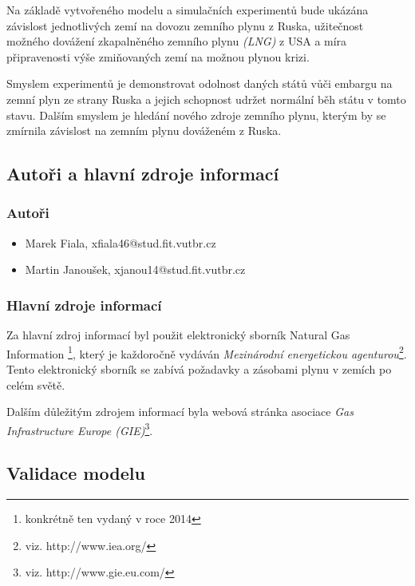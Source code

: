 \documentclass[a4paper,11pt]{article}
\begin{document}
Na základě vytvořeného modelu a simulačních experimentů bude ukázána závislost jednotlivých zemí na dovozu zemního plynu z Ruska, 
užitečnost možného dovážení zkapalněného zemního plynu \textit{(LNG)} z USA a míra připravenosti výše zmiňovaných zemí na možnou plynou krizi.

Smyslem experimentů je demonstrovat odolnost daných států vůči embargu na zemní plyn ze strany Ruska a jejich schopnost udržet normální běh státu v tomto stavu.
Dalším smyslem je hledání nového zdroje zemního plynu, kterým by se zmírnila závislost
na zemním plynu dováženém z Ruska.


\subsection{Autoři a hlavní zdroje informací}
\subsubsection{Autoři}


\begin{itemize}
\item Marek Fiala, xfiala46@stud.fit.vutbr.cz
\item Martin Janoušek, xjanou14@stud.fit.vutbr.cz
\end{itemize}

\subsubsection{Hlavní zdroje informací}
Za hlavní zdroj informací byl použit elektronický sborník Natural Gas Information \cite{IEA}\footnote{konkrétně ten vydaný v roce 2014},
který je každoročně vydáván \textit{Mezinárodní energetickou agenturou}\footnote{viz. http://www.iea.org/}.
Tento elektronický sborník se zabívá požadavky a zásobami plynu v zemích po celém světě.


Dalším důležitým zdrojem informací byla webová stránka asociace \textit{Gas Infrastructure Europe (GIE)}\footnote{viz. http://www.gie.eu.com/}.

\subsection{Validace modelu}
\end{document}
